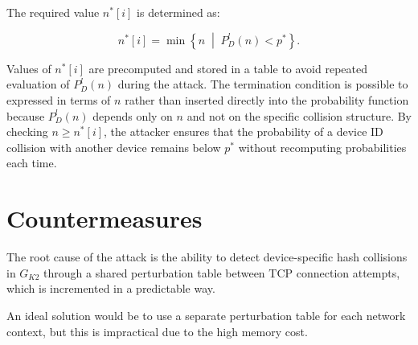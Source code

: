 \documentclass[twocolumn]{report}
\begin{document}
The required value \( n^*[i] \) is determined as:

\begin{minipage}{\columnwidth}
  \[
n^*[i]
=
\min
\left\{
n
\;\middle|\;
P_D^l(n)
<
p^*
\right\}.
\]
\end{minipage}

Values of \( n^*[i] \) are \alert{precomputed} and stored in a table to avoid repeated evaluation of \( P^l_D(n) \) during the attack. The termination condition is possible to expressed in terms of \( n \) rather than inserted directly into the probability function because \( P^l_D(n) \) depends only on \( n \) and \alert{not on the specific collision structure}. By checking \( n \ge n^*[i] \), the attacker ensures that the probability of a device ID collision with another device remains below \( p^* \) \alert{without recomputing probabilities} each time.

\vspace{0.2cm}


\section{Countermeasures}
\label{sec:countermeasures}

The \alert{root cause} of the attack is the ability to detect device-specific hash collisions in $G_{K2}$ through a shared perturbation table between TCP connection attempts, which is incremented in a predictable way.

An \alert{ideal solution} would be to use a separate perturbation table for each network context, but this is impractical due to the high memory cost.%
\end{document}
